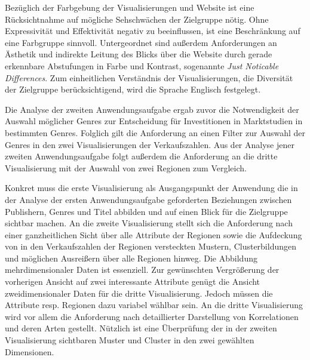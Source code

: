 \documentclass[usegeometry=true]{scrartcl}
\begin{document}
Bezüglich der Farbgebung der Visualisierungen und Website ist eine Rücksichtnahme auf mögliche Sehschwächen der Zielgruppe nötig. 
Ohne Expressivität und Effektivität negativ zu beeinflussen, ist eine Beschränkung auf eine Farbgruppe sinnvoll. 
Untergeordnet sind außerdem Anforderungen an Ästhetik und indirekte Leitung des Blicks über die Website durch gerade erkennbare Abstufungen in Farbe und Kontrast, sogenannte \textit{Just Noticable Differences}.
Zum einheitlichen Verständnis der Visualisierungen, die Diversität der Zielgruppe berücksichtigend, wird die Sprache Englisch festgelegt.

Die Analyse der zweiten Anwendungsaufgabe ergab zuvor die Notwendigkeit der Auswahl möglicher Genres zur Entscheidung für Investitionen in Marktstudien in bestimmten Genres.
Folglich gilt die Anforderung an einen Filter zur Auswahl der Genres in den zwei Visualisierungen der Verkaufszahlen. 
Aus der Analyse jener zweiten Anwendungsaufgabe folgt außerdem die Anforderung an die dritte Visualisierung mit der Auswahl von zwei Regionen zum Vergleich. 

Konkret muss die erste Visualisierung als Ausgangspunkt der Anwendung die in der Analyse der ersten Anwendungsaufgabe geforderten Beziehungen zwischen Publishern, Genres und Titel abbilden und auf einen Blick für die Zielgruppe sichtbar machen.
An die zweite Visualisierung stellt sich die Anforderung nach einer ganzheitlichen Sicht über alle Attribute der Regionen sowie die Aufdeckung von in den Verkaufszahlen der Regionen versteckten Mustern, Clusterbildungen und möglichen Ausreißern über alle Regionen hinweg.
Die Abbildung mehrdimensionaler Daten ist essenziell.
Zur gewünschten Vergrößerung der vorherigen Ansicht auf zwei interessante Attribute genügt die Ansicht zweidimensionaler Daten für die dritte Visualisierung.
Jedoch müssen die Attribute resp. Regionen dazu variabel wählbar sein. 
An die dritte Visualisierung wird vor allem die Anforderung nach detaillierter Darstellung von Korrelationen und deren Arten gestellt. 
Nützlich ist eine Überprüfung der in der zweiten Visualisierung sichtbaren Muster und Cluster in den zwei gewählten Dimensionen.
\end{document}
